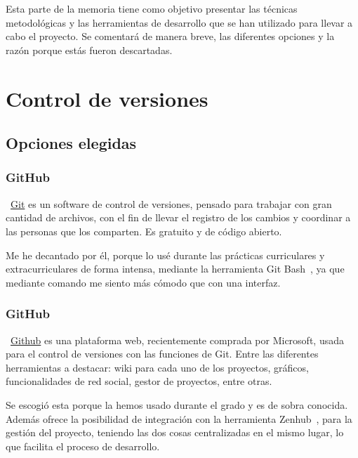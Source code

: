 
Esta parte de la memoria tiene como objetivo presentar las técnicas metodológicas y las herramientas de desarrollo que se han utilizado para llevar a cabo el proyecto. Se comentará de manera breve, las diferentes opciones y la razón porque estás fueron descartadas.
 
\section{Control de versiones}

\subsection{Opciones elegidas}

\subsubsection{GitHub}
~\href{https://git-scm.com//}{Git} es un software de control de versiones, pensado para trabajar con gran cantidad de archivos, con el fin de llevar el registro de los cambios y coordinar a las personas que los comparten. Es gratuito y de código abierto.

Me he decantado por él, porque lo usé durante las prácticas curriculares y extracurriculares de forma intensa, mediante la herramienta Git Bash~\pageref{gitbash}, ya que mediante comando me siento más cómodo que con una interfaz.

\subsubsection{GitHub}
~\href{https://github.com/}{Github} es una plataforma web, recientemente comprada por Microsoft, usada para el control de versiones con las funciones de Git. Entre las diferentes herramientas a destacar: wiki para cada uno de los proyectos, gráficos, funcionalidades de red social, gestor de proyectos, entre otras.

Se escogió esta porque la hemos usado durante el grado y es de sobra conocida. Además ofrece la posibilidad de integración con la herramienta Zenhub~\pageref{zenhub}, para la gestión del proyecto, teniendo las dos cosas centralizadas en el mismo lugar, lo que facilita el proceso de desarrollo.